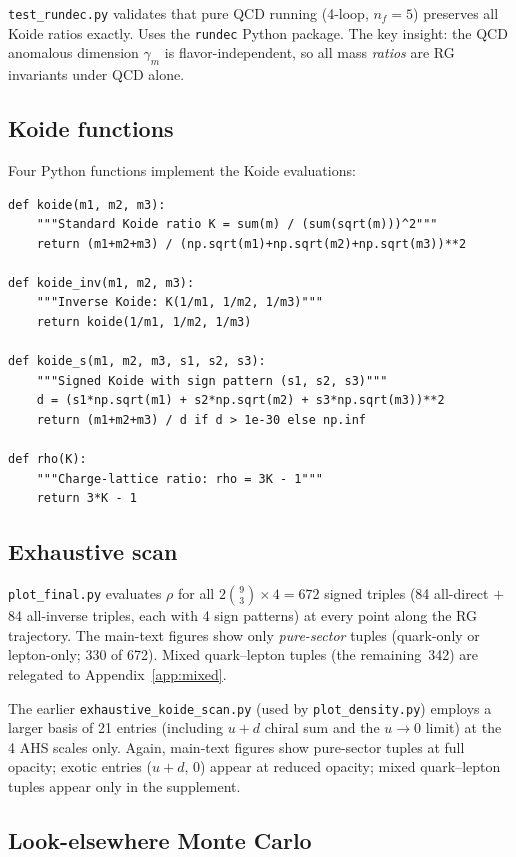 \documentclass[11pt,a4paper]{article}
\begin{document}
\texttt{test\_rundec.py} validates that pure QCD running (4-loop,
$n_f = 5$) preserves all Koide ratios exactly. Uses the \texttt{rundec}
Python package. The key insight: the QCD anomalous dimension $\gamma_m$
is flavor-independent, so all mass \emph{ratios} are RG invariants under
QCD alone.

\subsection{Koide functions}

Four Python functions implement the Koide evaluations:

\begin{lstlisting}
def koide(m1, m2, m3):
    """Standard Koide ratio K = sum(m) / (sum(sqrt(m)))^2"""
    return (m1+m2+m3) / (np.sqrt(m1)+np.sqrt(m2)+np.sqrt(m3))**2

def koide_inv(m1, m2, m3):
    """Inverse Koide: K(1/m1, 1/m2, 1/m3)"""
    return koide(1/m1, 1/m2, 1/m3)

def koide_s(m1, m2, m3, s1, s2, s3):
    """Signed Koide with sign pattern (s1, s2, s3)"""
    d = (s1*np.sqrt(m1) + s2*np.sqrt(m2) + s3*np.sqrt(m3))**2
    return (m1+m2+m3) / d if d > 1e-30 else np.inf

def rho(K):
    """Charge-lattice ratio: rho = 3K - 1"""
    return 3*K - 1
\end{lstlisting}

\subsection{Exhaustive scan}

\texttt{plot\_final.py} evaluates $\rho$ for all $2\binom{9}{3} \times 4 = 672$
signed triples (84 all-direct $+$ 84 all-inverse triples, each with 4 sign
patterns) at every point along the RG trajectory.
The main-text figures show only \emph{pure-sector} tuples (quark-only or
lepton-only; 330 of 672).  Mixed quark--lepton tuples (the remaining~342)
are relegated to Appendix~\ref{app:mixed}.

The earlier \texttt{exhaustive\_koide\_scan.py} (used by \texttt{plot\_density.py})
employs a larger basis of 21 entries (including $u{+}d$ chiral sum and the
$u \to 0$ limit) at the 4 AHS scales only.  Again, main-text figures show
pure-sector tuples at full opacity; exotic entries ($u{+}d$, $0$) appear at
reduced opacity; mixed quark--lepton tuples appear only in the supplement.

\subsection{Look-elsewhere Monte Carlo}
\end{document}
